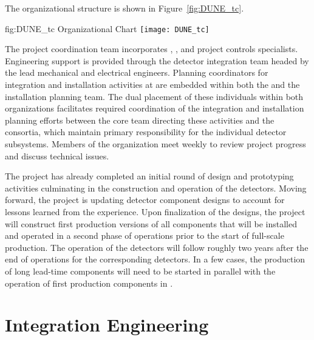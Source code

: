 The   organizational structure is shown 
in Figure~\ref{fig:DUNE_tc}.  

\begin{dunefigure}{fig:DUNE_tc}
  {  Organizational Chart}
  \texttt{[image: DUNE\_tc]}
\end{dunefigure}

The  project coordination team incorporates , 
, and project controls specialists.  Engineering support 
is provided through the  detector integration team 
headed by the lead  mechanical and electrical engineers.
Planning coordinators for integration and installation activities 
at  are embedded within both the  and the 
 installation planning team.  The dual placement of 
these individuals within both organizations facilitates required 
coordination of the integration and installation planning 
efforts between the core team directing these activities and the 
 consortia, which maintain primary responsibility for 
the individual detector subsystems.  Members of the  
organization meet weekly to review project progress and discuss 
technical issues. 

The  project has already completed an initial round of design 
and prototyping activities culminating in the construction and operation 
of the  detectors.  Moving forward, the project is 
updating detector component designs to account for lessons learned from 
the  experience.  Upon finalization of the designs, the 
project will construct first production versions of all components that 
will be installed and operated in a second phase of  
operations prior to the start of full-scale production.  The operation 
of the  detectors will follow roughly two years after
the end of operations for the corresponding  detectors.
In a few cases, the production of long lead-time components will need to 
be started in parallel with the operation of first production components 
in .

\section{Integration Engineering}
\label{sec:es-coord-integ-sysengr}

